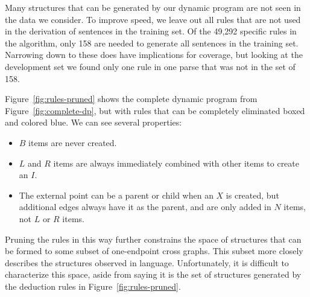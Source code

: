 Many structures that can be generated by our dynamic program are not seen in the data we consider.
To improve speed, we leave out all rules that are not used in the derivation of sentences in the training set.
Of the 49,292 specific rules in the algorithm, only 158 are needed to generate all sentences in the training set.
Narrowing down to these does have implications for coverage, but looking at the development set we found only one rule in one parse that was not in the set of 158.

Figure~\ref{fig:rules-pruned} shows the complete dynamic program from Figure~\ref{fig:complete-dp}, but with rules that can be completely eliminated boxed and colored blue.
We can see several properties:

\begin{itemize}
  \item $B$ items are never created.
  \item $L$ and $R$ items are always immediately combined with other items to create an $I$.
  \item The external point can be a parent or child when an $X$ is created, but additional edges always have it as the parent, and are only added in $N$ items, not $L$ or $R$ items.
\end{itemize}

Pruning the rules in this way further constrains the space of structures that can be formed to some subset of one-endpoint cross graphs.
This subset more closely describes the structures observed in language.
Unfortunately, it is difficult to characterize this space, aside from saying it is the set of structures generated by the deduction rules in Figure~\ref{fig:rules-pruned}.





